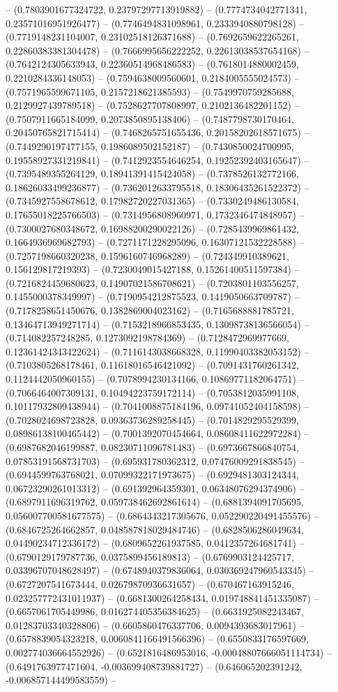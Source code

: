 -- (0.7803901677324722, 0.23797297713919882) -- (0.7774734042771341, 0.23571016951926477) -- (0.7746494831098961, 0.2333940880798128) -- (0.7719148231104007, 0.23102518126371688) -- (0.7692659622265261, 0.22860383381304478) -- (0.7666995656222252, 0.22613038537654168) -- (0.7642124305633943, 0.22360514968486583) -- (0.7618014880002459, 0.2210284336148053) -- (0.7594638009560601, 0.2184005555024573) -- (0.7571965599671105, 0.2157218621385593) -- (0.7549970759285688, 0.2129927439789518) -- (0.7528627707808997, 0.2102136482201152) -- (0.7507911665184099, 0.2073850895138406) -- (0.7487798730170464, 0.20450765821715414) -- (0.7468265751655436, 0.20158202618571675) -- (0.7449290197477155, 0.1986089502152187) -- (0.7430850024700995, 0.19558927331219841) -- (0.7412923554646254, 0.19252392403165647) -- (0.7395489355264129, 0.18941391415424058) -- (0.7378526132772166, 0.18626033499236877) -- (0.7362012633795518, 0.18306435261522372) -- (0.7345927558678612, 0.17982720227031365) -- (0.7330249486130584, 0.17655018225766503) -- (0.7314956808960971, 0.1732346474848957) -- (0.7300027680348672, 0.16988200290022126) -- (0.7285439969861432, 0.1664936969682793) -- (0.7271171228295096, 0.16307121532228588) -- (0.7257198660320238, 0.1596160746968289) -- (0.724349910389621, 0.156129817219393) -- (0.7230049015427188, 0.15261400511597384) -- (0.7216824459680623, 0.14907021586708621) -- (0.7203801103556257, 0.1455000378349997) -- (0.7190954212875523, 0.1419050663709787) -- (0.7178258651450676, 0.1382869004023162) -- (0.7165688881785721, 0.13464713949271714) -- (0.7153218966853435, 0.13098738136566054) -- (0.714082257248285, 0.1273092198784369) -- (0.7128472969977669, 0.12361424343422624) -- (0.7116143038668328, 0.11990403382053152) -- (0.7103805268178461, 0.11618016546421092) -- (0.7091431760261342, 0.1124442050960155) -- (0.7078994230134166, 0.10869771182064751) -- (0.7066464007309131, 0.10494223759172114) -- (0.7053812035991108, 0.10117932809438944) -- (0.7041008875184196, 0.09741052404158598) -- (0.7028024698723828, 0.09363736289258445) -- (0.7014829295529399, 0.08986138100465442) -- (0.7001392070454664, 0.08608411622972284) -- (0.6987682046199887, 0.08230711096781483) -- (0.6973667866840754, 0.07853191568731703) -- (0.695931780362312, 0.07476009291838545) -- (0.6944599763768021, 0.07099322171973675) -- (0.6929481303124344, 0.06723290261013312) -- (0.691392964359301, 0.06348076294374906) -- (0.6897911696319762, 0.059738462692861614) -- (0.6881394091705695, 0.056007700581677575) -- (0.6864343217305676, 0.052290220491455576) -- (0.6846725264662857, 0.048587818029484746) -- (0.6828506286049634, 0.04490234712336172) -- (0.6809652261937585, 0.0412357264681741) -- (0.6790129179787736, 0.0375899456189813) -- (0.6769903124425717, 0.03396707048628497) -- (0.6748940379836064, 0.030369247960543345) -- (0.6727207541673444, 0.02679870936631657) -- (0.670467163915246, 0.023257772431011937) -- (0.6681300264258434, 0.019748841451335087) -- (0.6657061705449986, 0.016274405356384625) -- (0.6631925082243467, 0.01283703340328806) -- (0.6605860476337706, 0.0094393683017961) -- (0.6578839054323218, 0.0060841166491566396) -- (0.6550833176597669, 0.002774036664552926) -- (0.6521816486953016, -0.00048807666051114734) -- (0.6491763977471604, -0.003699408739881727) -- (0.646065202391242, -0.006857144499583559) -- 